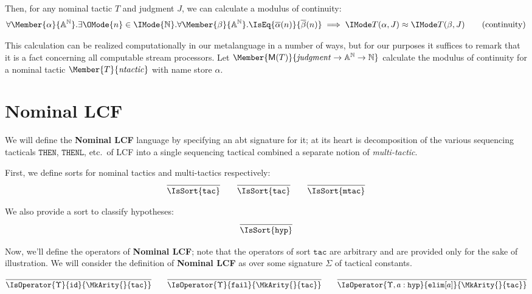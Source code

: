 Then, for any nominal tactic $T$ and judgment $J$, we can calculate a
modulus of continuity:
\begin{equation}
  \forall \Member{\alpha}{\MLStream{\MLAtom}}.
  \exists \OMode{n}\in\IMode{\MLNat}.
  \forall \Member{\beta}{\MLStream{\MLAtom}}.
    \IsEq{\bar{\alpha}(n)}{\bar{\beta}(n)}\implies \KleeneEq{T(\alpha,J)}{T(\beta,J)}
  \tag{continuity}
\end{equation}

This calculation can be realized computationally in our metalanguage in a
number of ways, but for our purposes it suffices to remark that it is a fact
concerning all computable stream processors. Let
$\Member{\ModC{T}}{\LCFJudgment\to\MLStream{\MLAtom}\to\MLNat}$ calculate the
modulus of continuity for a nominal tactic $\Member{T}{\LCFNominalTactic}$ with
name store $\alpha$.

\section{Nominal LCF}

\newcommand\SortTac{\mathtt{tac}}
\newcommand\SortMTac{\mathtt{mtac}}
\newcommand\SortHyp{\mathtt{hyp}}

We will define the \textbf{Nominal LCF} language by specifying an abt signature
for it; at its heart is decomposition of the various sequencing tacticals
$\mathtt{THEN}$, $\mathtt{THENL}$, etc.\ of LCF into a single sequencing
tactical combined a separate notion of \emph{multi-tactic}.

First, we define sorts for nominal tactics and multi-tactics respectively:
\begin{gather*}
  \infer{
    \IsSort{\SortTac}
  }{}
  \qquad
  \infer{
    \IsSort{\SortTac}
  }{}
  \qquad
  \infer{
    \IsSort{\SortMTac}
  }{}
\end{gather*}

We also provide a sort to classify hypotheses:
\[
  \infer{
    \IsSort{\SortHyp}
  }{
  }
\]

Now, we'll define the operators of \textbf{Nominal LCF}; note that the
operators of sort $\SortTac$ are arbitrary and are provided only for the sake
of illustration. We will consider the definition of \textbf{Nominal LCF} as
over some signature $\Sigma$ of tactical constants.

\[
  \infer{
    \IsOperator{\Upsilon}{\mathtt{id}}{
      \MkArity{}{\SortTac}
    }
  }{
  }
  \qquad
  \infer{
    \IsOperator{\Upsilon}{\mathtt{fail}}{
      \MkArity{}{\SortTac}
    }
  }{
  }
  \qquad
  \infer{
    \IsOperator{\Upsilon,a:\SortHyp}{\mathtt{elim}[a]}{
      \MkArity{}{\SortTac}
    }
  }{
  }
\]

